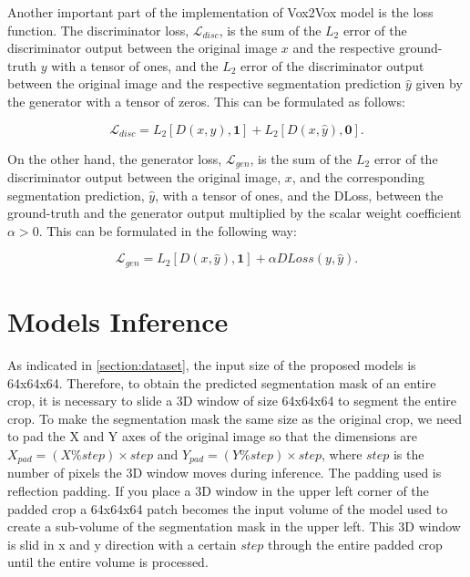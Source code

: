 Another important part of the implementation of Vox2Vox model is the loss function. The discriminator loss, $\mathcal{L}_{disc}$, is the sum of the $L_2$ error of the discriminator output between the original image $x$ and the respective ground-truth $y$ with a tensor of ones, and the $L_2$ error of the discriminator output between the original image and the respective segmentation prediction $\hat{y}$ given by the generator with a tensor of zeros. This can be formulated as follows:

\begin{equation}
    \mathcal{L}_{disc} = L_2[D(x,y),\boldsymbol{1}] + L_2[D(x,\hat{y}),\boldsymbol{0}].
\end{equation}

On the other hand, the generator loss, $\mathcal{L}_{gen}$, is the sum of the $L_2$ error of the discriminator output between the original image, $x$, and the corresponding segmentation prediction, $\hat{y}$, with a tensor of ones, and the \ac{DLoss}, between the ground-truth and the generator output multiplied by the scalar weight coefficient $\alpha > 0$. This can be formulated in the following way:

\begin{equation}
\label{eq:vox2vox-generator-loss}
    \mathcal{L}_{gen} = L_2[D(x,\hat{y}),\boldsymbol{1}] + \alpha DLoss(y,\hat{y}).
\end{equation}

\section{Models Inference}
\label{section:models_inference}

As indicated in \ref{section:dataset}, the input size of the proposed models is 64x64x64. Therefore, to obtain the predicted segmentation mask of an entire crop, it is necessary to slide a 3D window of size 64x64x64 to segment the entire crop. To make the segmentation mask the same size as the original crop, we need to pad the X and Y axes of the original image so that the dimensions are $X_{pad} = (X \% step) \times step $ and $Y_{pad} = (Y \% step) \times step $, where $step$ is the number of pixels the 3D window moves during inference. The padding used is reflection padding. If you place a 3D window in the upper left corner of the padded crop a 64x64x64 patch becomes the input volume of the model used to create a sub-volume of the segmentation mask in the upper left. This 3D window is slid in x and y direction with a certain $step$ through the entire padded crop until the entire volume is processed.



